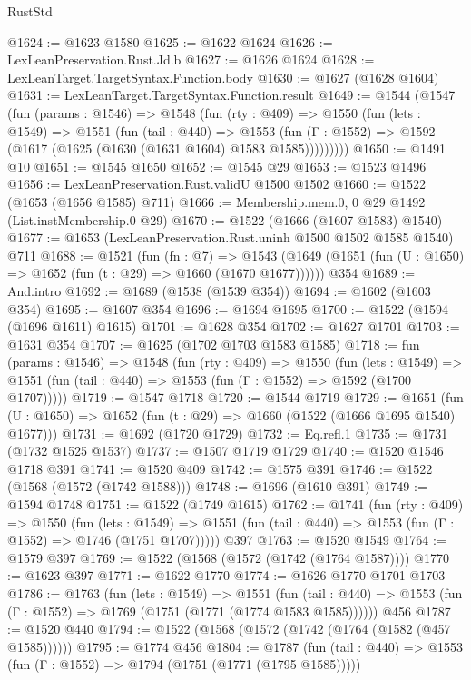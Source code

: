 \begin{lexlean}{RustStd}
\begin{coremodule}
@1624 := @1623 @1580
@1625 := @1622 @1624
@1626 := LexLeanPreservation.Rust.Jd.b
@1627 := @1626 @1624
@1628 := LexLeanTarget.TargetSyntax.Function.body
@1630 := @1627 (@1628 @1604)
@1631 := LexLeanTarget.TargetSyntax.Function.result
@1649 := @1544
    (@1547
      (fun (params : @1546) =>
      @1548
        (fun (rty : @409) =>
        @1550
          (fun (lets : @1549) =>
          @1551
            (fun (tail : @440) =>
            @1553 (fun (Γ : @1552) => @1592 (@1617 (@1625 (@1630 (@1631 @1604) @1583 @1585)))))))))
@1650 := @1491 @10
@1651 := @1545 @1650
@1652 := @1545 @29
@1653 := @1523 @1496
@1656 := LexLeanPreservation.Rust.validU @1500 @1502
@1660 := @1522 (@1653 (@1656 @1585) @711)
@1666 := Membership.mem.{0, 0} @29 @1492 (List.instMembership.{0} @29)
@1670 := @1522 (@1666 (@1607 @1583) @1540)
@1677 := @1653 (LexLeanPreservation.Rust.uninh @1500 @1502 @1585 @1540) @711
@1688 := @1521
    (fun (fn : @7) =>
    @1543 (@1649 (@1651 (fun (U : @1650) => @1652 (fun (t : @29) => @1660 (@1670 @1677))))))
    @354
@1689 := And.intro
@1692 := @1689 (@1538 (@1539 @354))
@1694 := @1602 (@1603 @354)
@1695 := @1607 @354
@1696 := @1694 @1695
@1700 := @1522 (@1594 (@1696 @1611) @1615)
@1701 := @1628 @354
@1702 := @1627 @1701
@1703 := @1631 @354
@1707 := @1625 (@1702 @1703 @1583 @1585)
@1718 := fun (params : @1546) =>
  @1548
    (fun (rty : @409) =>
    @1550
      (fun (lets : @1549) =>
      @1551 (fun (tail : @440) => @1553 (fun (Γ : @1552) => @1592 (@1700 @1707)))))
@1719 := @1547 @1718
@1720 := @1544 @1719
@1729 := @1651 (fun (U : @1650) => @1652 (fun (t : @29) => @1660 (@1522 (@1666 @1695 @1540) @1677)))
@1731 := @1692 (@1720 @1729)
@1732 := Eq.refl.{1}
@1735 := @1731 (@1732 @1525 @1537)
@1737 := @1507 @1719 @1729
@1740 := @1520 @1546 @1718 @391
@1741 := @1520 @409
@1742 := @1575 @391
@1746 := @1522 (@1568 (@1572 (@1742 @1588)))
@1748 := @1696 (@1610 @391)
@1749 := @1594 @1748
@1751 := @1522 (@1749 @1615)
@1762 := @1741
    (fun (rty : @409) =>
    @1550
      (fun (lets : @1549) =>
      @1551 (fun (tail : @440) => @1553 (fun (Γ : @1552) => @1746 (@1751 @1707)))))
    @397
@1763 := @1520 @1549
@1764 := @1579 @397
@1769 := @1522 (@1568 (@1572 (@1742 (@1764 @1587))))
@1770 := @1623 @397
@1771 := @1622 @1770
@1774 := @1626 @1770 @1701 @1703
@1786 := @1763
    (fun (lets : @1549) =>
    @1551
      (fun (tail : @440) => @1553 (fun (Γ : @1552) => @1769 (@1751 (@1771 (@1774 @1583 @1585))))))
    @456
@1787 := @1520 @440
@1794 := @1522 (@1568 (@1572 (@1742 (@1764 (@1582 (@457 @1585))))))
@1795 := @1774 @456
@1804 := @1787
    (fun (tail : @440) => @1553 (fun (Γ : @1552) => @1794 (@1751 (@1771 (@1795 @1585)))))

\end{coremodule}
\end{lexlean}

